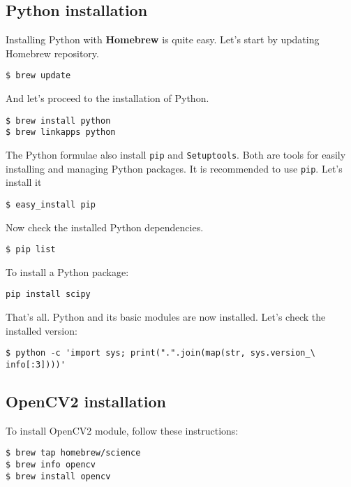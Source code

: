 \documentclass[a4paper, 11pt]{article}
\begin{document}
\subsection*{Python installation}

Installing Python with \textbf{Homebrew} is quite easy. Let's start by updating Homebrew repository.

\begin{verbatim}
$ brew update
\end{verbatim}

And let's proceed to the installation of Python.

\begin{verbatim}
$ brew install python
$ brew linkapps python
\end{verbatim}

The Python formulae also install \texttt{pip} and \texttt{Setuptools}. Both are tools for easily installing and managing Python packages. It is recommended to use \texttt{pip}. Let's install it

\begin{verbatim}
$ easy_install pip
\end{verbatim}

Now check the installed Python dependencies.

\begin{verbatim}
$ pip list
\end{verbatim}

To install a Python package:

\begin{verbatim}
pip install scipy
\end{verbatim}

That's all. Python and its basic modules are now installed. Let's check the installed version:

\begin{verbatim}
$ python -c 'import sys; print(".".join(map(str, sys.version_\
info[:3])))'
\end{verbatim}

\subsection*{OpenCV2 installation}

To install OpenCV2 module, follow these instructions:

\begin{verbatim}
$ brew tap homebrew/science
$ brew info opencv
$ brew install opencv
\end{verbatim}
\end{document}
